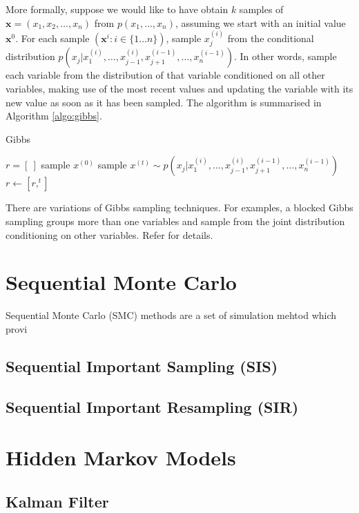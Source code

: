 More formally, suppose we would like to have obtain $k$ samples of $\mathbf{x}=(x_1,x_2,\ldots, x_n)$ from $p(x_1, \ldots, x_n)$, assuming we start with an initial value $\mathbf{x}^{0}$. For each sample $(\mathbf{x}^{i}: i \in \{1 \dots n\})$, sample $x_j^{(i)}$ from the conditional distribution $p(x_j|x_1^{(i)},\dots,x_{j-1}^{(i)},x_{j+1}^{(i-1)},\dots,x_n^{(i-1)})$. In other words, sample each variable from the distribution of that variable conditioned on all other variables, making use of the most recent values and updating the variable with its new value as soon as it has been sampled. The algorithm is summarised in Algorithm \ref{algo:gibbs}.

\begin{algorithm}
\caption{Gibbs}\label{algo:gibbs}
\begin{algorithmic}[1]
\State $r = [\ ]$
\State sample $x^{(0)}$
\Repeat
  \State sample $x^{(t)} \sim p(x_j|x_1^{(i)},\dots,x_{j-1}^{(i)},x_{j+1}^{(i-1)},\dots,x_n^{(i-1)})$
  \State $r \gets [r,^{t}]$
\EndFunction
\end{algorithmic}
\end{algorithm}

There are variations of Gibbs sampling techniques. For examples, a blocked Gibbs sampling groups more than one variables and sample from the joint distribution conditioning on other variables. Refer \cite{RCP05} for details. 

\section{Sequential Monte Carlo}
Sequential Monte Carlo (SMC) methods are a set of simulation mehtod which provi

\subsection{Sequential Important Sampling (SIS)}

\subsection{Sequential Important Resampling (SIR)}

\section{Hidden Markov Models}

\subsection{Kalman Filter}

